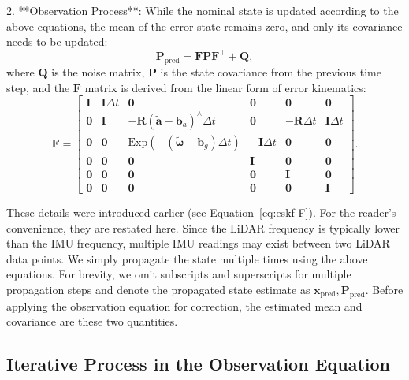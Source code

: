 2. **Observation Process**: While the nominal state is updated according to the above equations, the mean of the error state remains zero, and only its covariance needs to be updated:  
\begin{equation}\label{key}  
	\mathbf{P}_{\text{pred}} = \mathbf{F} \mathbf{P} \mathbf{F}^\top + \mathbf{Q},  
\end{equation}  
where $\mathbf{Q}$ is the noise matrix, $\mathbf{P}$ is the state covariance from the previous time step, and the $\mathbf{F}$ matrix is derived from the linear form of error kinematics:  
\begin{equation}  
	\mathbf{F} = \begin{bmatrix}  
		\mathbf{I} & \mathbf{I} \Delta t & \mathbf{0} & \mathbf{0} & \mathbf{0} & \mathbf{0} \\  
		\mathbf{0} & \mathbf{I} & - \mathbf{R}(\tilde{\mathbf{a}} - \mathbf{b}_a)^\wedge \Delta t & \mathbf{0} & -\mathbf{R} \Delta t & \mathbf{I} \Delta t \\  
		\mathbf{0} & \mathbf{0} & \mathrm{Exp}\left( -(\tilde{\boldsymbol{\omega}} - \mathbf{b}_g) \Delta t \right)   
		& -\mathbf{I} \Delta t & \mathbf{0} &\mathbf{0} \\  
		\mathbf{0} & \mathbf{0} & \mathbf{0} & \mathbf{I} & \mathbf{0} & \mathbf{0} \\  
		\mathbf{0} & \mathbf{0} & \mathbf{0} & \mathbf{0} & \mathbf{I} & \mathbf{0} \\  
		\mathbf{0} & \mathbf{0} & \mathbf{0} & \mathbf{0} & \mathbf{0} & \mathbf{I}  
	\end{bmatrix}.  
\end{equation}  

These details were introduced earlier (see Equation~\eqref{eq:eskf-F}). For the reader's convenience, they are restated here. Since the LiDAR frequency is typically lower than the IMU frequency, multiple IMU readings may exist between two LiDAR data points. We simply propagate the state multiple times using the above equations. For brevity, we omit subscripts and superscripts for multiple propagation steps and denote the propagated state estimate as $\mathbf{x}_{\mathrm{pred}}, \mathbf{P}_{\mathrm{pred}}$. Before applying the observation equation for correction, the estimated mean and covariance are these two quantities.

\subsection{Iterative Process in the Observation Equation}  

